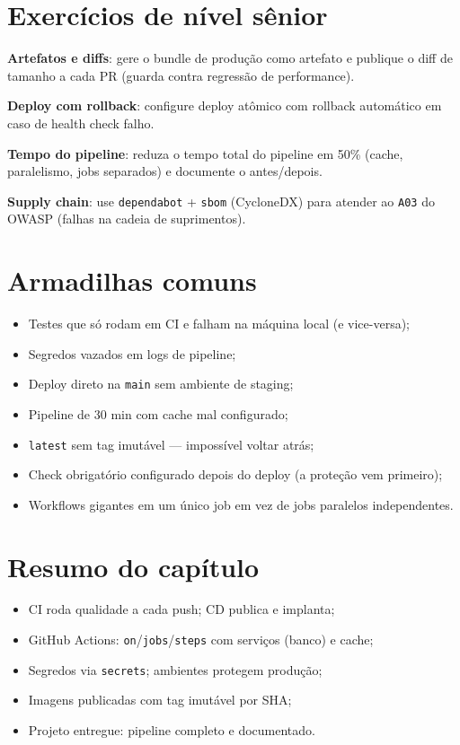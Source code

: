 \section{Exercícios de nível sênior}

\begin{seniores}
  \item \textbf{Artefatos e diffs}: gere o bundle de produção como artefato e publique o diff de tamanho a cada PR (guarda contra regressão de performance).
  \item \textbf{Deploy com rollback}: configure deploy atômico com rollback automático em caso de health check falho.
  \item \textbf{Tempo do pipeline}: reduza o tempo total do pipeline em 50\% (cache, paralelismo, jobs separados) e documente o antes/depois.
  \item \textbf{Supply chain}: use \texttt{dependabot} + \texttt{sbom} (CycloneDX) para atender ao \texttt{A03} do OWASP (falhas na cadeia de suprimentos).
\end{seniores}

\section{Armadilhas comuns}

\begin{itemize}[leftmargin=*, itemsep=0.4em]
  \item Testes que só rodam em CI e falham na máquina local (e vice-versa);
  \item Segredos vazados em logs de pipeline;
  \item Deploy direto na \texttt{main} sem ambiente de staging;
  \item Pipeline de 30 min com cache mal configurado;
  \item \texttt{latest} sem tag imutável — impossível voltar atrás;
  \item Check obrigatório configurado depois do deploy (a proteção vem primeiro);
  \item Workflows gigantes em um único job em vez de jobs paralelos independentes.
\end{itemize}

\section{Resumo do capítulo}

\begin{itemize}[leftmargin=*, itemsep=0.3em]
  \item CI roda qualidade a cada push; CD publica e implanta;
  \item GitHub Actions: \texttt{on}/\texttt{jobs}/\texttt{steps} com serviços (banco) e cache;
  \item Segredos via \texttt{secrets}; ambientes protegem produção;
  \item Imagens publicadas com tag imutável por SHA;
  \item Projeto entregue: pipeline completo e documentado.
\end{itemize}

